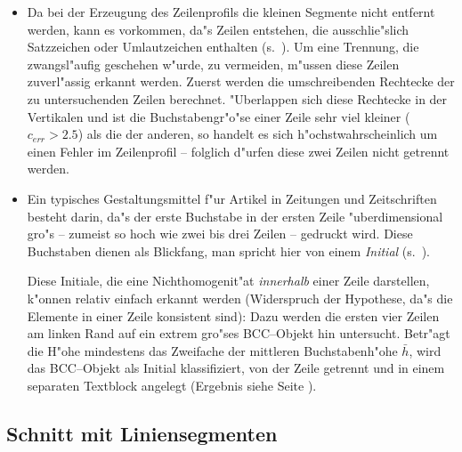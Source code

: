 \begin{enumerate}
\begin{itemize}
          \item Da bei der Erzeugung des Zeilenprofils die kleinen Segmente nicht entfernt werden, kann
                es vorkommen, da"s Zeilen entstehen, die ausschlie"slich Satzzeichen
                oder Umlautzeichen enthalten
                (s.\ ). Um eine Trennung, die zwangsl"aufig geschehen w"urde, zu
                vermeiden, m"ussen diese Zeilen zuverl"assig erkannt werden. Zuerst werden die
                umschreibenden Rechtecke der zu untersuchenden Zeilen berechnet. "Uberlappen sich diese
                Rechtecke in der Vertikalen und ist die Buchstabengr"o"se einer Zeile sehr viel kleiner
                ($c_{err} > 2.5$) als die der anderen, so handelt es sich h"ochstwahrscheinlich um einen
                Fehler im Zeilenprofil -- folglich d"urfen diese zwei Zeilen nicht getrennt werden.


          \item Ein typisches Gestaltungsmittel f"ur Artikel in Zeitungen und Zeitschriften
                besteht darin, da"s der erste Buchstabe in der ersten Zeile
                "uberdimensional gro"s -- zumeist so hoch wie zwei bis drei Zeilen -- gedruckt wird.
                Diese Buchstaben dienen als Blickfang, man spricht hier von einem {\em Initial\/}
                (s.\ ).


                Diese Initiale, die eine Nichthomogenit"at {\em innerhalb\/} einer Zeile darstellen,
                k"onnen relativ einfach erkannt werden (Widerspruch der Hypothese, da"s die Elemente in
                einer Zeile konsistent sind):
                Dazu werden die ersten vier Zeilen am linken Rand auf ein extrem gro"ses BCC--Objekt hin
                untersucht. Betr"agt die H"ohe mindestens das Zweifache der mittleren Buchstabenh"ohe $\bar{h}$,
                wird das BCC--Objekt als Initial klassifiziert, von der Zeile getrennt und in einem
                separaten Textblock angelegt (Ergebnis siehe  Seite
                \pageref{eps:HomoCheckErg}).
        \end{itemize}
\end{enumerate}

\subsection{Schnitt mit Liniensegmenten}\label{LinienSchnitte}

